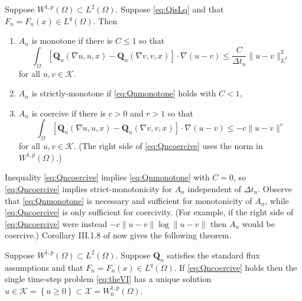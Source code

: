 \documentclass[final,onefignum]{siamart190516}
\newcommand\bQ{\mathbf{Q}}
\newcommand{\grad}{\nabla}
\begin{document}
\begin{lemma}  \label{lem:monotonecoercive}  Suppose $W^{1,p}(\Omega) \subset L^2(\Omega)$.  Suppose \eqref{eq:QisLq} and that $F_n=F_n(x) \in L^q(\Omega)$.  Then
\renewcommand{\labelenumi}{(\roman{enumi})}
\begin{enumerate}
\item  $A_n$ is monotone if there is $C\le 1$ so that
\begin{equation}
\int_\Omega \left[\bQ_n(\grad u,u,x) - \bQ_n(\grad v,v,x)\right] \cdot \grad(u-v) \le \frac{C}{\Delta t_n} \|u-v\|_{L^2}^2 \label{eq:Qnmonotone}
\end{equation}
for all $u,v \in \mathcal{K}$.
\item  $A_n$ is strictly-monotone if \eqref{eq:Qnmonotone} holds with $C<1$,
\item  $A_n$ is coercive if there is $c>0$ and $r>1$ so that
\begin{equation}
\int_\Omega \left[\bQ_n(\grad u,u,x) - \bQ_n(\grad v,v,x)\right] \cdot \grad(u-v) \le - c \|u-v\|^r \label{eq:Qncoercive}
\end{equation}
for all $u,v \in \mathcal{K}$.  (The right side of \eqref{eq:Qncoercive} uses the norm in $W^{1,p}(\Omega)$.)
\end{enumerate}
\end{lemma}

Inequality \eqref{eq:Qncoercive} implies \eqref{eq:Qnmonotone} with $C=0$, so \eqref{eq:Qncoercive} implies strict-monotonicity for $A_n$ independent of $\Delta t_n$.  Observe that \eqref{eq:Qnmonotone} is necessary and sufficient for monotonicity of $A_n$, while \eqref{eq:Qncoercive} is only sufficient for coercivity.  (For example, if the right side of \eqref{eq:Qncoercive} were instead $- c \|u-v\| \log \|u-v\|$ then $A_n$ would be coercive.)  Corollary III.1.8 of \cite{KinderlehrerStampacchia1980} now gives the following theorem.

\begin{theorem}  \label{thm:monowellposed}  Suppose $W^{1,p}(\Omega) \subset L^2(\Omega)$.  Suppose $\bQ_n$ satisfies the standard flux assumptions and that $F_n=F_n(x)\in L^q(\Omega)$.  If \eqref{eq:Qncoercive} holds then the single time-step problem \eqref{eq:theVI} has a unique solution $u\in\mathcal{K} = \left\{u\ge 0\right\} \subset \mathcal{X}=W_0^{1,p}(\Omega)$.
\end{theorem}
\end{document}
